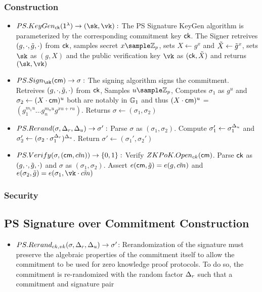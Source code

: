 \subsubsection{Construction}
\begin{itemize}
    \item $PS.KeyGen_{\ck}(\secparam) \to (\sk, \vk):$ The PS Signature KeyGen algorithm is parameterized by the corresponding commitment key $\mathsf{ck}$. The Signer retreives $(g, \cdot, \tilde{g}, \cdot)$ from $\mathsf{ck}$, samples secret $x \sample \Zp$, sets $X \gets g^x$ and $\tilde{X} \gets \tilde{g}^x$, sets $\sk$ as $(g, X)$ and the public verification key $\vk$ as $(\mathsf{ck}, \tilde{X})$ and returns $(\sk, \vk)$

    \item $PS.Sign_{\sk}(\cm) \to \sigma: $ The signing algorithm signs the commitment. Retreives $(g, \cdot, \tilde{g}, \cdot)$ from $\mathsf{ck}$, Samples $u \sample \Zp$, Computes $\sigma_1$ as $g^u$ and $\sigma_2 \gets (X \cdot \mathsf{cm})^u$ both are notably in $\mathbb{G}_1$ and thus $(X \cdot \mathsf{cm})^u$ = $(g_1^{m_1u}\dots g_n^{m_nu}g^{xu+ru})$. Returns $\sigma \gets (\sigma_1, \sigma_2)$    

    \item $PS.Rerand(\sigma, \Delta_r, \Delta_u) \to \sigma':$ Parse $\sigma$ as $(\sigma_1, \sigma_2)$. Compute $\sigma_1' \gets \sigma_1^{\Delta_u}$ and $\sigma_2' \gets (\sigma_2 \cdot \sigma_1^{\Delta_r})^{\Delta_u}$. Return $\sigma' \gets (\sigma_1', \sigma_2')$

    \item $PS.Verify(\sigma, (\mathsf{cm}, \tilde{cm})) \to \{0,1\}:$ Verify $ZKPoK.Open_{ck}(\mathsf{cm})$. Parse $\mathsf{ck}$ as $(g, \cdot, \tilde{g}, \cdot)$ and $\sigma$ as $(\sigma_1, \sigma_2)$. Assert $e(\mathsf{cm}, \tilde{g}) = e(g, \tilde{cm})$ and $e(\sigma_2, \tilg) = e(\sigma_1, \vk \cdot \tilcm)$

\end{itemize}

\subsubsection{Security}


\subsection{PS Signature over Commitment Construction}
\begin{itemize}
    \item $PS.Rerand_{ck,vk}(\sigma, \Delta_r, \Delta_u) \to \sigma'$: Rerandomization of the signature must preserve the algebraic properties of the commitment itself to allow the commitment to be used for zero knowledge proof protocols. To do so, the commitment is re-randomized with the random factor $\Delta_r$ such that a commitment and signature pair 

\end{itemize}

